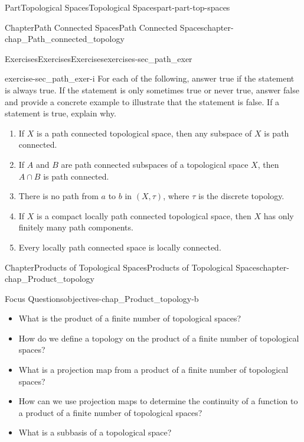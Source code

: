 \documentclass[oneside,10pt,]{book}
\numberwithin{equation}{chapter}
\begin{document}
\begin{partptx}{Part}{Topological Spaces}{}{Topological Spaces}{}{}{part-part-top-spaces}
\begin{chapterptx}{Chapter}{Path Connected Spaces}{}{Path Connected Spaces}{}{}{chapter-chap_Path_connected_topology}
\begin{exercises-section}{Exercises}{Exercises}{}{Exercises}{}{}{exercises-sec_path_exer}
\begin{divisionexercise}{9}{}{}{exercise-sec_path_exer-i}%
For each of the following, answer true if the statement is always true. If the statement is only sometimes true or never true, answer false and provide a concrete example to illustrate that the statement is false. If a statement is true, explain why.%
\begin{enumerate}[font=\bfseries,label=(\alph*),ref=\alph*]%
\item{}If \(X\) is a path connected topological space, then any subspace of \(X\) is path connected.%
\item{}If \(A\) and \(B\) are path connected subspaces of a topological space \(X\), then \(A \cap B\) is path connected.%
\item{}There is no path from \(a\) to \(b\) in \((X, \tau)\), where \(\tau\) is the discrete topology.%
\item{}If \(X\) is a compact locally path connected topological space, then \(X\) has only finitely many path components.%
\item{}Every locally path connected space is locally connected.%
\end{enumerate}%
\end{divisionexercise}%
\end{exercises-section}
\end{chapterptx}
%
\typeout{************************************************}
\typeout{************************************************}
%
\begin{chapterptx}{Chapter}{Products of Topological Spaces}{}{Products of Topological Spaces}{}{}{chapter-chap_Product_topology}
\renewcommand*{\chaptername}{Chapter}
\begin{objectives}{Focus Questions}{objectives-chap_Product_topology-b}
%
\begin{itemize}[label=\textbullet]
\item{}What is the product of a finite number of topological spaces?%
\item{}How do we define a topology on the product of a finite number of topological spaces?%
\item{}What is a projection map from a product of a finite number of topological spaces?%
\item{}How can we use projection maps to determine the continuity of a function to a product of a finite number of topological spaces?%
\item{}What is a subbasis of a topological space?%

\end{itemize}
\end{objectives}
\end{chapterptx}
\end{partptx}
\end{document}

